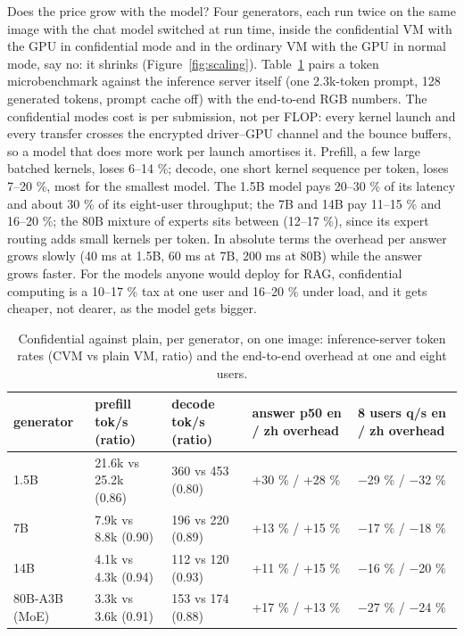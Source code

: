 \documentclass[letterpaper,twocolumn,10pt]{article}
\begin{document}
Does the price grow with the model? Four generators, each run twice on the same image with the chat model switched at run time, inside the confidential VM with the GPU in confidential mode and in the ordinary VM with the GPU in normal mode, say no: it shrinks (Figure~\ref{fig:scaling}). Table~\ref{tab:scale} pairs a token microbenchmark against the inference server itself (one 2.3k-token prompt, 128 generated tokens, prompt cache off) with the end-to-end RGB numbers. The confidential mode\textquotesingle s cost is per submission, not per FLOP: every kernel launch and every transfer crosses the encrypted driver--GPU channel and the bounce buffers, so a model that does more work per launch amortises it. Prefill, a few large batched kernels, loses 6--14 \%; decode, one short kernel sequence per token, loses 7--20 \%, most for the smallest model. The 1.5B model pays 20--30 \% of its latency and about 30 \% of its eight-user throughput; the 7B and 14B pay 11--15 \% and 16--20 \%; the 80B mixture of experts sits between (12--17 \%), since its expert routing adds small kernels per token. In absolute terms the overhead per answer grows slowly (40 ms at 1.5B, 60 ms at 7B, 200 ms at 80B) while the answer grows faster. For the models anyone would deploy for RAG, confidential computing is a 10--17 \% tax at one user and 16--20 \% under load, and it gets cheaper, not dearer, as the model gets bigger.

\begin{table}[t]\centering\small\setlength{\tabcolsep}{4pt}
\begin{tabular}{p{1.2in}p{1.5in}p{1.5in}p{1.5in}p{1.5in}}\toprule
\textbf{generator} & \textbf{prefill tok/s (ratio)} & \textbf{decode tok/s (ratio)} & \textbf{answer p50 en / zh overhead} & \textbf{8 users q/s en / zh overhead} \\ \midrule
1.5B & 21.6k vs 25.2k (0.86) & 360 vs 453 (0.80) & +30 \% / +28 \% & −29 \% / −32 \% \\
7B & 7.9k vs 8.8k (0.90) & 196 vs 220 (0.89) & +13 \% / +15 \% & −17 \% / −18 \% \\
14B & 4.1k vs 4.3k (0.94) & 112 vs 120 (0.93) & +11 \% / +15 \% & −16 \% / −20 \% \\
80B-A3B (MoE) & 3.3k vs 3.6k (0.91) & 153 vs 174 (0.88) & +17 \% / +13 \% & −27 \% / −24 \% \\
\bottomrule\end{tabular}
\caption{Confidential against plain, per generator, on one image: inference-server token rates (CVM vs plain VM, ratio) and the end-to-end overhead at one and eight users.}\label{tab:scale}
\end{table}
\end{document}
